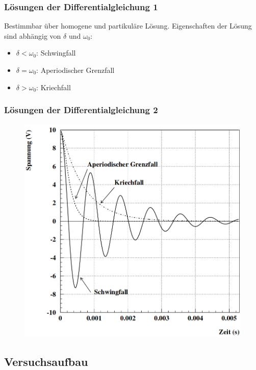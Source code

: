 \documentclass{beamer}
\begin{document}
\begin{frame}
\frametitle{Lösungen der Differentialgleichung 1}
Bestimmbar über homogene und partikuläre Lösung.
Eigenschaften der Lösung sind abhängig von $\delta$ und $\omega_0$:
\begin{itemize}
\item $\delta < \omega_0$: Schwingfall
\item $\delta = \omega_0$: Aperiodischer Grenzfall
\item $\delta > \omega_0$: Kriechfall
\end{itemize}
\end{frame}

\begin{frame}
\frametitle{Lösungen der Differentialgleichung 2}
\begin{figure}
\includegraphics[scale = 0.25]{abbildungen/typen_schwingung.png}
\end{figure}
\end{frame}


\subsection{Versuchsaufbau}
\end{document}
